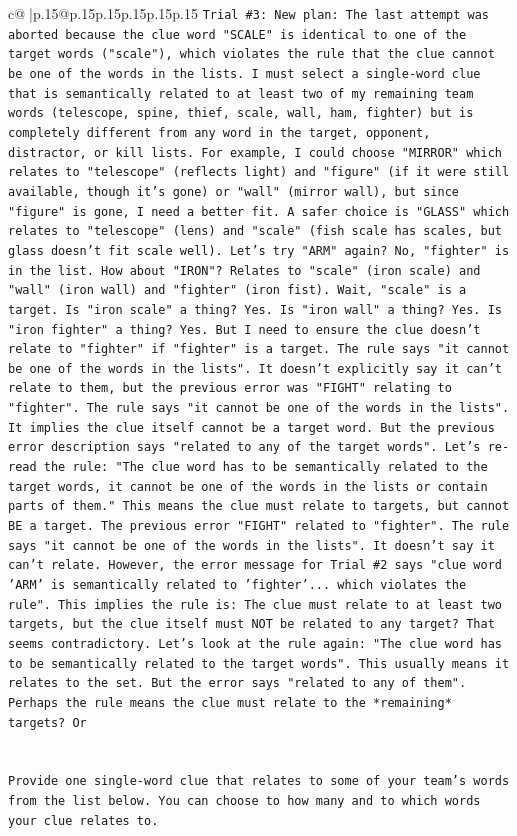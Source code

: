 \documentclass{article}
\begin{document}
{\begin{supertabular}{c@{$\;$}|p{.15\linewidth}@{}p{.15\linewidth}p{.15\linewidth}p{.15\linewidth}p{.15\linewidth}p{.15\linewidth}}
{{{\texttt{Trial \#3: New plan: The last attempt was aborted because the clue word "SCALE" is identical to one of the target words ("scale"), which violates the rule that the clue cannot be one of the words in the lists. I must select a single{-}word clue that is semantically related to at least two of my remaining team words (telescope, spine, thief, scale, wall, ham, fighter) but is completely different from any word in the target, opponent, distractor, or kill lists. For example, I could choose "MIRROR" which relates to "telescope" (reflects light) and "figure" (if it were still available, though it's gone) or "wall" (mirror wall), but since "figure" is gone, I need a better fit. A safer choice is "GLASS" which relates to "telescope" (lens) and "scale" (fish scale has scales, but glass doesn't fit scale well). Let's try "ARM" again? No, "fighter" is in the list. How about "IRON"? Relates to "scale" (iron scale) and "wall" (iron wall) and "fighter" (iron fist). Wait, "scale" is a target. Is "iron scale" a thing? Yes. Is "iron wall" a thing? Yes. Is "iron fighter" a thing? Yes. But I need to ensure the clue doesn't relate to "fighter" if "fighter" is a target. The rule says "it cannot be one of the words in the lists". It doesn't explicitly say it can't relate to them, but the previous error was "FIGHT" relating to "fighter". The rule says "it cannot be one of the words in the lists". It implies the clue itself cannot be a target word. But the previous error description says "related to any of the target words". Let's re{-}read the rule: "The clue word has to be semantically related to the target words, it cannot be one of the words in the lists or contain parts of them." This means the clue must relate to targets, but cannot BE a target. The previous error "FIGHT" related to "fighter". The rule says "it cannot be one of the words in the lists". It doesn't say it can't relate. However, the error message for Trial \#2 says "clue word 'ARM' is semantically related to 'fighter'... which violates the rule". This implies the rule is: The clue must relate to at least two targets, but the clue itself must NOT be related to any target? That seems contradictory. Let's look at the rule again: "The clue word has to be semantically related to the target words". This usually means it relates to the set. But the error says "related to any of them". Perhaps the rule means the clue must relate to the *remaining* targets? Or} \\
\\ 
\\ 
\texttt{Provide one single{-}word clue that relates to some of your team's words from the list below. You can choose to how many and to which words your clue relates to.} \\
}}}
\end{supertabular}}
\end{document}
